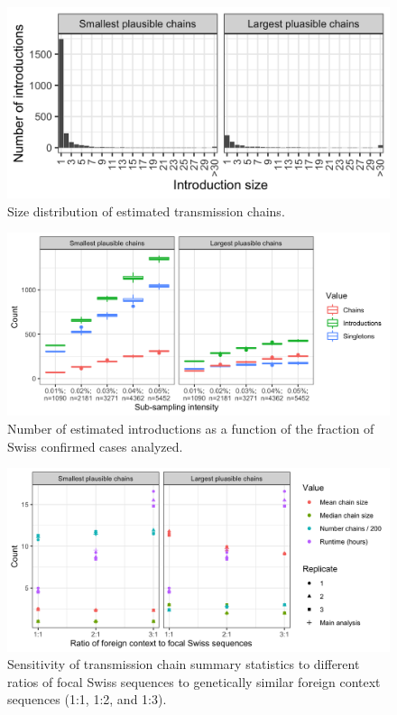 \documentclass[9pt,twoside,lineno]{pnas-new}
\begin{document}
\begin{figure}
\centering
\includegraphics[width = 11.4cm]{figures/chain_size_dist.png}
\caption{Size distribution of estimated transmission chains.}  
\label{fig:chain_size_dist}
\end{figure}

\begin{figure}
\centering
\includegraphics[width = 11.4cm]{figures/fig_SX_sensitivity_subsampling.png}
\caption{Number of estimated introductions as a function of the fraction of Swiss confirmed cases analyzed.}  
\label{fig:sensitivity_downsampling}
\end{figure}

\begin{figure}
\centering
\includegraphics[width = 11.4cm]{figures/fig_SX_sensitivity_context_set_size.png}
\caption{Sensitivity of transmission chain summary statistics to different ratios of focal Swiss sequences to genetically similar foreign context sequences (1:1, 1:2, and 1:3).}  
\label{fig:sensitivity_context_set_size}
\end{figure}
\end{document}
